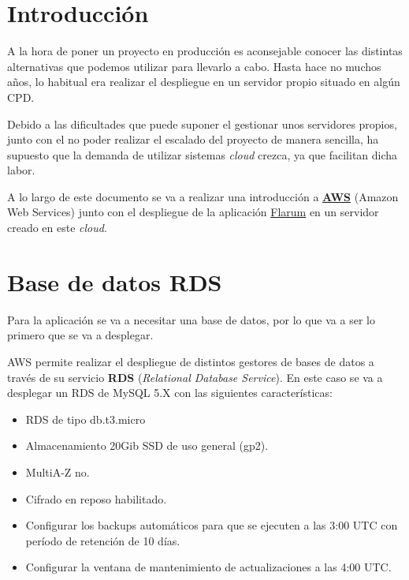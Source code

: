 \documentclass{\ClassPath/viu-tfm-template}
\begin{document}
    \graphicspath{{../VIU_TFM_LaTeX_template/}}

    \coverpage

    \tableofcontents

\chapter{Introducción}

A la hora de poner un proyecto en producción es aconsejable conocer las distintas alternativas que podemos utilizar para llevarlo a cabo. Hasta hace no muchos años, lo habitual era realizar el despliegue en un servidor propio situado en algún CPD.

Debido a las dificultades que puede suponer el gestionar unos servidores propios, junto con el no poder realizar el escalado del proyecto de manera sencilla, ha supuesto que la demanda de utilizar sistemas \textit{cloud} crezca, ya que facilitan dicha labor.

A lo largo de este documento se va a realizar una introducción a \textbf{\href{https://aws.amazon.com/es/}{AWS}} (Amazon Web Services) junto con el despliegue de la aplicación \href{https://flarum.org/}{Flarum} en un servidor creado en este \textit{cloud}.


\chapter{Base de datos RDS}
Para la aplicación se va a necesitar una base de datos, por lo que va a ser lo primero que se va a desplegar.

AWS permite realizar el despliegue de distintos gestores de bases de datos a través de su servicio \textbf{RDS} (\textit{Relational Database Service}). En este caso se va a desplegar un RDS de MySQL 5.X con las siguientes características:

\begin{itemize}
    \item RDS de tipo db.t3.micro
    \item Almacenamiento 20Gib SSD de uso general (gp2).
    \item MultiA-Z no.
    \item Cifrado en reposo habilitado.
    \item Configurar los backups automáticos para que se ejecuten a las 3:00 UTC con período de retención de 10
    días.
    \item Configurar la ventana de mantenimiento de actualizaciones a las 4:00 UTC.
\end{itemize}
\end{document}
